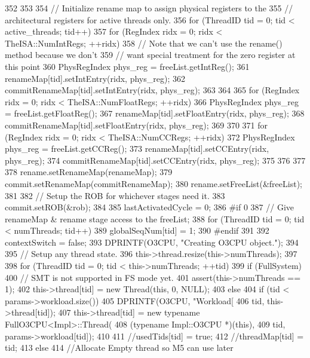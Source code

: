 \begin{DoxyCode}
{{352     }
353 
354     // Initialize rename map to assign physical registers to the
355     // architectural registers for active threads only.
356     for (ThreadID tid = 0; tid < active_threads; tid++) {
357         for (RegIndex ridx = 0; ridx < TheISA::NumIntRegs; ++ridx) {
358             // Note that we can't use the rename() method because we don't
359             // want special treatment for the zero register at this point
360             PhysRegIndex phys_reg = freeList.getIntReg();
361             renameMap[tid].setIntEntry(ridx, phys_reg);
362             commitRenameMap[tid].setIntEntry(ridx, phys_reg);
363         }
364 
365         for (RegIndex ridx = 0; ridx < TheISA::NumFloatRegs; ++ridx) {
366             PhysRegIndex phys_reg = freeList.getFloatReg();
367             renameMap[tid].setFloatEntry(ridx, phys_reg);
368             commitRenameMap[tid].setFloatEntry(ridx, phys_reg);
369         }
370 
371         for (RegIndex ridx = 0; ridx < TheISA::NumCCRegs; ++ridx) {
372             PhysRegIndex phys_reg = freeList.getCCReg();
373             renameMap[tid].setCCEntry(ridx, phys_reg);
374             commitRenameMap[tid].setCCEntry(ridx, phys_reg);
375         }
376     }
377 
378     rename.setRenameMap(renameMap);
379     commit.setRenameMap(commitRenameMap);
380     rename.setFreeList(&freeList);
381 
382     // Setup the ROB for whichever stages need it.
383     commit.setROB(&rob);
384 
385     lastActivatedCycle = 0;
386 #if 0
387     // Give renameMap & rename stage access to the freeList;
388     for (ThreadID tid = 0; tid < numThreads; tid++)
389         globalSeqNum[tid] = 1;
390 #endif
391 
392     contextSwitch = false;
393     DPRINTF(O3CPU, "Creating O3CPU object.\n");
394 
395     // Setup any thread state.
396     this->thread.resize(this->numThreads);
397 
398     for (ThreadID tid = 0; tid < this->numThreads; ++tid) {
399         if (FullSystem) {
400             // SMT is not supported in FS mode yet.
401             assert(this->numThreads == 1);
402             this->thread[tid] = new Thread(this, 0, NULL);
403         } else {
404             if (tid < params->workload.size()) {
405                 DPRINTF(O3CPU, "Workload[%
406                         tid, this->thread[tid]);
407                 this->thread[tid] = new typename FullO3CPU<Impl>::Thread(
408                         (typename Impl::O3CPU *)(this),
409                         tid, params->workload[tid]);
410 
411                 //usedTids[tid] = true;
412                 //threadMap[tid] = tid;
413             } else {
414                 //Allocate Empty thread so M5 can use later
}}}}
\end{DoxyCode}
